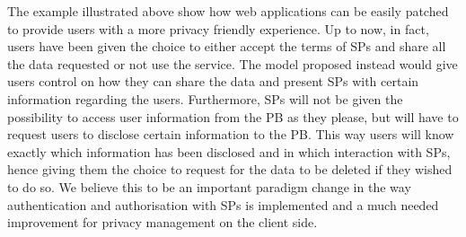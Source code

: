 The example illustrated above show how web applications can be easily patched to provide users with a more privacy friendly experience. Up to now, in fact, users have been given the choice to either accept the terms of SPs and share all the data requested or not use the service. The model proposed instead would give users control on how they can share the data and present SPs with certain information regarding the users. 
Furthermore, SPs will not be given the possibility to access user information from the PB as they please, but will have to request users to disclose certain information to the PB. This way users will know exactly which information has been disclosed and in which interaction with SPs, hence giving them the choice to request for the data to be deleted if they wished to do so.
We believe this to be an important paradigm change in the way authentication and authorisation with SPs is implemented and a much needed improvement for privacy management on the client side.